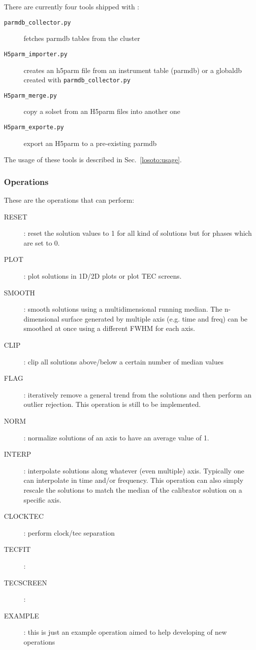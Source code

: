 \documentclass[structabstract]{article}
\begin{document}
There are currently four tools shipped with \losoto{}:
\begin{description}
 \item[\texttt{parmdb\_collector.py}] fetches parmdb tables from the cluster
 \item[\texttt{H5parm\_importer.py}] creates an h5parm file from an instrument table (parmdb) or a globaldb created with \texttt{parmdb\_collector.py}
 \item[\texttt{H5parm\_merge.py}] copy a solset from an H5parm files into another one
 \item[\texttt{H5parm\_exporte.py}] export an H5parm to a pre-existing parmdb
\end{description}

The usage of these tools is described in Sec.~\ref{losoto:usage}.

\subsubsection{Operations}
\label{losoto:operations}

These are the operations that \losoto{} can perform:
\begin{description}
 \item[RESET]: reset the solution values to 1 for all kind of solutions but for phases which are set to 0.
 \item[PLOT]: plot solutions in 1D/2D plots or plot TEC screens.
 \item[SMOOTH]: smooth solutions using a multidimensional running median. The n-dimensional surface generated by multiple axis (e.g. time and freq) can be smoothed at once using a different FWHM for each axis.
 \item[CLIP]: clip all solutions above/below a certain number of median values
 \item[FLAG]: iteratively remove a general trend from the solutions and then perform an outlier rejection. This operation is still to be implemented.
 \item[NORM]: normalize solutions of an axis to have an average value of 1.
 \item[INTERP]: interpolate solutions along whatever (even multiple) axis. Typically one can interpolate in time and/or frequency. This operation can also simply rescale the solutions to match the median of the calibrator solution on a specific axis.
 \item[CLOCKTEC]: perform clock/tec separation
 \item[TECFIT]: 
 \item[TECSCREEN]: 
 \item[EXAMPLE]: this is just an example operation aimed to help developing of new operations 
\end{description}
\end{document}
